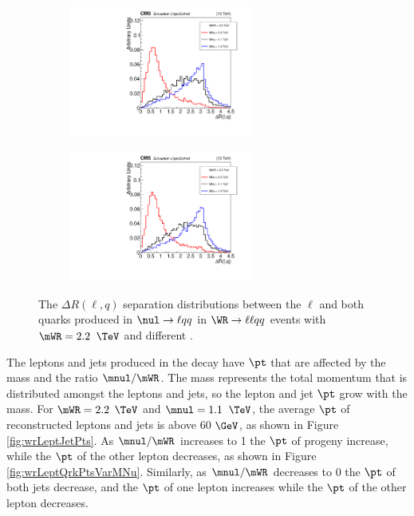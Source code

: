 \begin{figure}
	\centering
	\begin{subfigure}[t]{2.4in}
		\centering
		\includegraphics[width=2.4in]{figures/dRgenLeptonFromScdHvyPtclGenQuarkOneFromScdHvyPtcl_MWR_2200_several_MNu_private.pdf}
	\end{subfigure}
	\thickspace
	\begin{subfigure}[t]{2.4in}
		\centering
		\includegraphics[width=2.4in]{figures/dRgenLeptonFromScdHvyPtclGenQuarkTwoFromScdHvyPtcl_MWR_2200_several_MNu_private.pdf}
	\end{subfigure}
	\caption{The $\Delta R(\ell,q)$ separation distributions between the $\ell$ and both quarks produced in $\nul \rightarrow \ell qq$ 
		in $\WR \rightarrow \ell\ell qq$ events with $\mWR = 2.2$ $\TeV$ and different \mnul.}\label{fig:wrDrLeptQrkVarMNu}
\end{figure}
\clearpage

The leptons and jets produced in the \WR decay have $\pt$ that are affected by the \WR mass and the ratio $\mnul/\mWR$.  The \WR mass 
represents the total momentum that is distributed amongst the leptons and jets, so the lepton and jet $\pt$ grow with the \WR mass.  
For $\mWR = 2.2$ $\TeV$ and $\mnul = 1.1$ $\TeV$, the average $\pt$ of reconstructed leptons and jets is above 60 $\GeV$, as shown 
in Figure \ref{fig:wrLeptJetPts}.  As $\mnul/\mWR$ increases to 1 the $\pt$ of \nul progeny increase, 
while the $\pt$ of the other lepton decreases, as shown in Figure \ref{fig:wrLeptQrkPtsVarMNu}.  Similarly, as $\mnul/\mWR$ decreases 
to 0 the $\pt$ of both jets decrease, and the $\pt$ of one lepton increases while the $\pt$ of the other lepton decreases.

